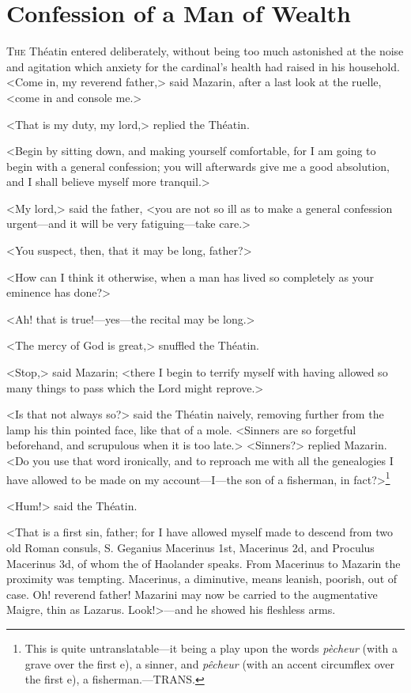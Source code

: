 \chapter{Confession of a Man of Wealth}

\lettrine{T}{he} Théatin entered deliberately, without being too much astonished at the noise and agitation which anxiety for the cardinal's health had raised in his household. <Come in, my reverend father,> said Mazarin, after a last look at the ruelle, <come in and console me.>

<That is my duty, my lord,> replied the Théatin.

<Begin by sitting down, and making yourself comfortable, for I am going to begin with a general confession; you will afterwards give me a good absolution, and I shall believe myself more tranquil.>

<My lord,> said the father, <you are not so ill as to make a general confession urgent—and it will be very fatiguing—take care.>

<You suspect, then, that it may be long, father?>

<How can I think it otherwise, when a man has lived so completely as your eminence has done?>

<Ah! that is true!—yes—the recital may be long.>

<The mercy of God is great,> snuffled the Théatin.

<Stop,> said Mazarin; <there I begin to terrify myself with having allowed so many things to pass which the Lord might reprove.>

<Is that not always so?> said the Théatin naively, removing further from the lamp his thin pointed face, like that of a mole. <Sinners are so forgetful beforehand, and scrupulous when it is too late.>
<Sinners?> replied Mazarin. <Do you use that word ironically, and to reproach me with all the genealogies I have allowed to be made on my account—I—the son of a fisherman, in fact?>\footnote{This is quite untranslatable—it being a play upon the words \textit{pècheur} (with a grave over the first e), a sinner, and \textit{pêcheur} (with an accent circumflex over the first e), a fisherman.—TRANS.}


<Hum!> said the Théatin.

<That is a first sin, father; for I have allowed myself made to descend from two old Roman consuls, S. Geganius Macerinus 1st, Macerinus 2d, and Proculus Macerinus 3d, of whom the  of Haolander speaks. From Macerinus to Mazarin the proximity was tempting. Macerinus, a diminutive, means leanish, poorish, out of case. Oh! reverend father! Mazarini may now be carried to the augmentative Maigre, thin as Lazarus. Look!>—and he showed his fleshless arms.

